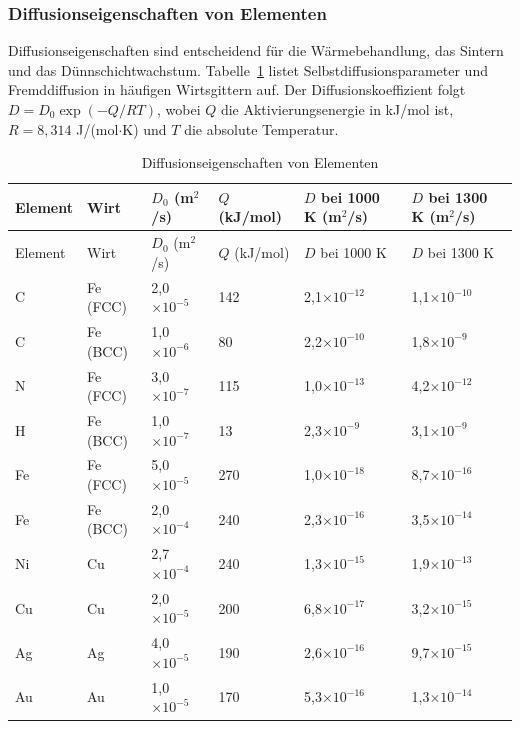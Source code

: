 \documentclass[12pt,a4paper]{article}
\begin{document}
	\subsubsection{Diffusionseigenschaften von Elementen}
	\label{subsec:diffusion-properties-func}
	
	Diffusionseigenschaften sind entscheidend für die Wärmebehandlung, das Sintern und das Dünnschichtwachstum. Tabelle~\ref{tab:diffusion-properties-func} listet Selbstdiffusionsparameter und Fremddiffusion in häufigen Wirtsgittern auf. Der Diffusionskoeffizient folgt \(D = D_0 \exp(-Q/RT)\), wobei \(Q\) die Aktivierungsenergie in kJ/mol ist, \(R = 8,314\) J/(mol\(\cdot\)K) und \(T\) die absolute Temperatur.
	
	\begin{longtable}{p{1.2cm}p{1.2cm}p{2.0cm}p{2.5cm}p{2.5cm}p{2.5cm}}
		\caption{Diffusionseigenschaften von Elementen} \label{tab:diffusion-properties-func} \\
		\toprule
		Element & Wirt & \(D_0\) (m\(^2\)/s) & \(Q\) (kJ/mol) & \(D\) bei 1000 K (m\(^2\)/s) & \(D\) bei 1300 K (m\(^2\)/s) \\
		\midrule
		\endfirsthead
		\toprule
		Element & Wirt & \(D_0\) (m\(^2\)/s) & \(Q\) (kJ/mol) & \(D\) bei 1000 K & \(D\) bei 1300 K \\
		\midrule
		\endhead
		C & Fe (FCC) & 2,0\(\times10^{-5}\) & 142 & 2,1\(\times10^{-12}\) & 1,1\(\times10^{-10}\) \\
		C & Fe (BCC) & 1,0\(\times10^{-6}\) & 80 & 2,2\(\times10^{-10}\) & 1,8\(\times10^{-9}\) \\
		N & Fe (FCC) & 3,0\(\times10^{-7}\) & 115 & 1,0\(\times10^{-13}\) & 4,2\(\times10^{-12}\) \\
		H & Fe (BCC) & 1,0\(\times10^{-7}\) & 13 & 2,3\(\times10^{-9}\) & 3,1\(\times10^{-9}\) \\
		Fe & Fe (FCC) & 5,0\(\times10^{-5}\) & 270 & 1,0\(\times10^{-18}\) & 8,7\(\times10^{-16}\) \\
		Fe & Fe (BCC) & 2,0\(\times10^{-4}\) & 240 & 2,3\(\times10^{-16}\) & 3,5\(\times10^{-14}\) \\
		Ni & Cu & 2,7\(\times10^{-4}\) & 240 & 1,3\(\times10^{-15}\) & 1,9\(\times10^{-13}\) \\
		Cu & Cu & 2,0\(\times10^{-5}\) & 200 & 6,8\(\times10^{-17}\) & 3,2\(\times10^{-15}\) \\
		Ag & Ag & 4,0\(\times10^{-5}\) & 190 & 2,6\(\times10^{-16}\) & 9,7\(\times10^{-15}\) \\
		Au & Au & 1,0\(\times10^{-5}\) & 170 & 5,3\(\times10^{-16}\) & 1,3\(\times10^{-14}\) \\

\end{longtable}
\end{document}
